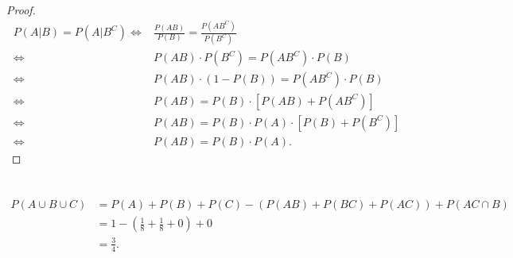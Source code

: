 \documentclass{article}
\begin{document}
\section{}  %
\begin{proof}
    \begin{align*}
        P(A|B)=P(A|B^{C})
        \Leftrightarrow &
        \frac{P(AB)}{P(B)} = \frac{P(AB^C)}{P(B^{C})}\\
        \Leftrightarrow &
        P(AB)\cdot P(B^{C}) = P(AB^{C})\cdot P(B)\\
        \Leftrightarrow &
        P(AB)\cdot (1-P(B)) = P(AB^{C})\cdot P(B)\\
        \Leftrightarrow &
        P(AB) = P(B)\cdot \left[P(AB)+P(AB^{C})\right]\\
        \Leftrightarrow &
        P(AB) = P(B)\cdot P(A)\cdot \left[P(B)+P(B^{C})\right]\\
        \Leftrightarrow &
        P(AB) = P(B)\cdot P(A).
    \end{align*}
\end{proof}

\section{}  %
\begin{align*}
    P(A\cup B\cup C)
    & = 
    P(A)+P(B)+P(C)-\left(P(AB)+P(BC)+P(AC)\right)+P(AC\cap B)\\
    & =
    1-(\frac{1}{8}+\frac{1}{8}+0)+0\\
    & =
    \frac{3}{4}.
\end{align*}

\section{}  %
\end{document}
